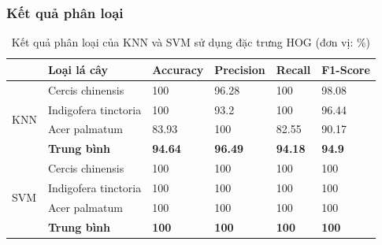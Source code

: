 \documentclass[a4paper]{article}
\begin{document}
\subsubsection{Kết quả phân loại}
\begin{table}[h]
    \caption{Kết quả phân loại của KNN và SVM sử dụng đặc trưng HOG (đơn vị: \%)}
    \label{tab:kq_HOG}
    \begin{center}
        \renewcommand{\arraystretch}{1} 
        \begin{tabular}{|p{1.5cm}|p{4cm}|p{2cm}|p{2cm}|p{2cm}|p{2cm}|}
            \hline
            \textbf{} & \textbf{Loại lá cây} & \textbf{Accuracy} & \textbf{Precision} & \textbf{Recall} & \textbf{F1-Score}  \\
            \hline
            \multirow{4}{1cm}{\centering KNN} & Cercis chinensis & 100 & 96.28 & 100 & 98.08  \\
            \cline{2-6}
            &  Indigofera tinctoria & 100 & 93.2 & 100 & 96.44  \\
            \cline{2-6}
            &  Acer palmatum & 83.93 & 100 & 82.55 & 90.17  \\
            \cline{2-6}
            & \textbf{Trung bình} & \textbf{94.64} & \textbf{96.49} & \textbf{94.18} & \textbf{94.9} \\
            \hline
            \multirow{4}{1cm}{\centering SVM} & Cercis chinensis & 100 & 100 & 100 & 100  \\
            \cline{2-6}
            &  Indigofera tinctoria & 100 & 100 & 100 & 100  \\
            \cline{2-6}
            &  Acer palmatum & 100 & 100 & 100 & 100  \\
            \cline{2-6}
            & \textbf{Trung bình} & \textbf{100} & \textbf{100} & \textbf{100} & \textbf{100} \\
            \hline
        \end{tabular}
    \end{center}
\end{table}
\end{document}

